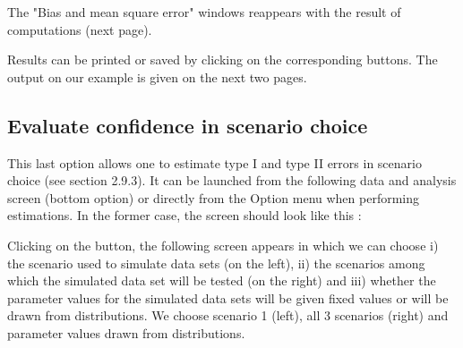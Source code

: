 {%

The "Bias and mean square error" windows reappears with the result of computations (next page).
\newpage


Results can be printed or saved by clicking on the corresponding buttons. The output on our example is given on the next two pages.

\newpage

\newpage

\clearpage
\subsection{Evaluate confidence in scenario choice}
This last option allows one to estimate type I and type II errors in scenario choice (see section 2.9.3). It can be launched from the following data and analysis screen (bottom option) or directly from the Option menu when performing estimations. In the former case, the screen should look like this :


Clicking on the \fbox{\textsf{$>>$}} button, the following screen appears in which we can choose i) the scenario used to simulate data sets (on the left), ii) the scenarios among which the simulated data set will be tested (on the right) and iii) whether the parameter values for the simulated data sets will be given fixed values or will be drawn from distributions. We choose scenario 1 (left), all 3 scenarios (right) and parameter values drawn from distributions.

}
